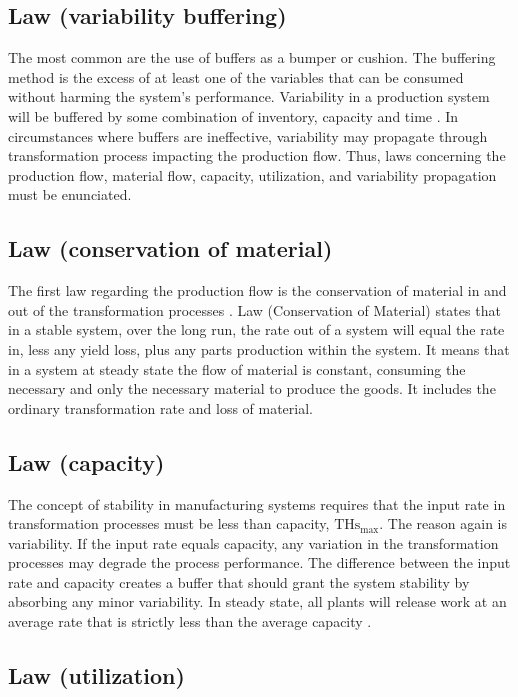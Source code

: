 \documentclass{article}
\begin{document}
\subsection{Law (variability buffering)}

The most common are the use of buffers as a bumper or cushion.
The buffering method is the excess of at least one of the variables that can be consumed without harming the system's performance.
Variability in a production system will be buffered by some combination of inventory, capacity and time \citep[p.295]{Hopp2001}.
In circumstances where buffers are ineffective, variability may propagate through transformation process impacting the production flow.
Thus, laws concerning the production flow, material flow, capacity, utilization, and variability propagation must be enunciated.

\subsection{Law (conservation of material)}

The first law regarding the production flow is the conservation of material in and out of the transformation processes \citep{Hopp2001}.
Law (Conservation of Material) states that in a stable system, over the long run, the rate out of a system will equal the rate in, less any yield loss, plus any parts production within the system.
It means that in a system at steady state the flow of material is constant, consuming the necessary and only the necessary material to produce the goods.
It includes the ordinary transformation rate and loss of material.

\subsection{Law (capacity)}
The concept of stability in manufacturing systems requires that the input rate in transformation processes must be less than capacity, \(\mbox{THs}_{\mbox{max}}\).
The reason again is variability.
If the input rate equals capacity, any variation in the transformation processes may degrade the process performance.
The difference between the input rate and capacity creates a buffer that should grant the system stability by absorbing any minor variability.
In steady state, all plants will release work at an average rate that is strictly less than the average capacity \citep[p.303]{Hopp2001}.

\subsection{Law (utilization)}
\end{document}
